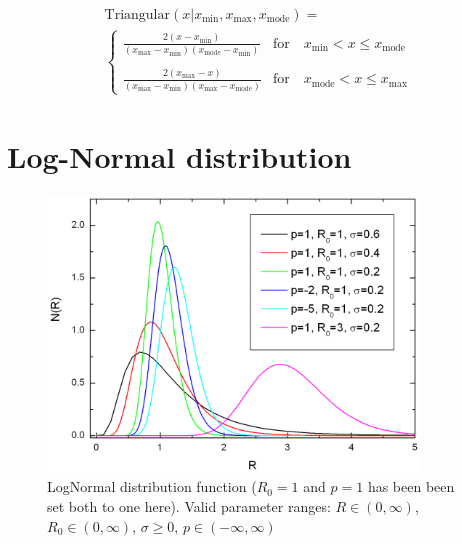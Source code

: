 \begin{subequations}
\begin{multline}
\text{Triangular}(x\vert x_\text{min},x_\text{max},x_\text{mode})   =  \\
   \begin{cases}
      \displaystyle \frac{2(x-x_\text{min})}{(x_\text{max}-x_\text{min})(x_\text{mode}-x_\text{min})} & \text{for} \quad x_\text{min}<x\leq x_\text{mode} \\
      & \\
      \displaystyle \frac{2(x_\text{max}-x)}{(x_\text{max}-x_\text{min})(x_\text{max}-x_\text{mode})} & \text{for} \quad x_\text{mode}<x\leq x_\text{max}
   \end{cases}
\end{multline}
\end{subequations}


\clearpage
\section{Log-Normal distribution}
\label{sect:LogNormSD}
\begin{figure}[htb]
\begin{center}
\includegraphics[width=0.878\textwidth,height=0.656\textwidth]{LogNorm.png}
\end{center}
\caption{LogNormal distribution function ($R_0=1$ and $p=1$ has
been been set both to one here). Valid parameter ranges: $R \in
(0,\infty)$, $R_0 \in (0,\infty)$, $\sigma\geq 0$, $p \in
(-\infty,\infty)$} \label{NogNormal}
\end{figure}


